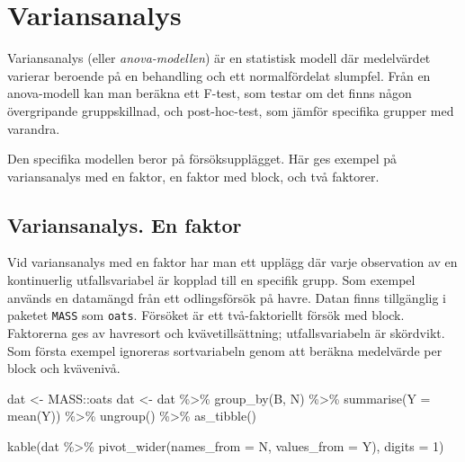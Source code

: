 \documentclass[
]{book}
\newenvironment{Shaded}{\begin{snugshade}}{\end{snugshade}}
\newcommand{\AttributeTok}[1]{\textcolor[rgb]{0.77,0.63,0.00}{#1}}
\newcommand{\DecValTok}[1]{\textcolor[rgb]{0.00,0.00,0.81}{#1}}
\newcommand{\FunctionTok}[1]{\textcolor[rgb]{0.00,0.00,0.00}{#1}}
\newcommand{\NormalTok}[1]{#1}
\newcommand{\OtherTok}[1]{\textcolor[rgb]{0.56,0.35,0.01}{#1}}
\newcommand{\SpecialCharTok}[1]{\textcolor[rgb]{0.00,0.00,0.00}{#1}}
\theoremstyle{definition}
\theoremstyle{definition}
\theoremstyle{definition}
\theoremstyle{definition}
\theoremstyle{remark}
\begin{document}
\hypertarget{variansanalys}{%
\chapter{Variansanalys}\label{variansanalys}}

Variansanalys (eller \emph{anova-modellen}) är en statistisk modell där medelvärdet varierar beroende på en behandling och ett normalfördelat slumpfel. Från en anova-modell kan man beräkna ett F-test, som testar om det finns någon övergripande gruppskillnad, och post-hoc-test, som jämför specifika grupper med varandra.

Den specifika modellen beror på försöksupplägget. Här ges exempel på variansanalys med en faktor, en faktor med block, och två faktorer.

\hypertarget{variansanalys.-en-faktor}{%
\section{Variansanalys. En faktor}\label{variansanalys.-en-faktor}}

Vid variansanalys med en faktor har man ett upplägg där varje observation av en kontinuerlig utfallsvariabel är kopplad till en specifik grupp. Som exempel används en datamängd från ett odlingsförsök på havre. Datan finns tillgänglig i paketet \texttt{MASS} som \texttt{oats}. Försöket är ett två-faktoriellt försök med block. Faktorerna ges av havresort och kvävetillsättning; utfallsvariabeln är skördvikt. Som första exempel ignoreras sortvariabeln genom att beräkna medelvärde per block och kvävenivå.

\begin{Shaded}
\begin{Highlighting}[]
\NormalTok{dat }\OtherTok{\textless{}{-}}\NormalTok{ MASS}\SpecialCharTok{::}\NormalTok{oats}
\NormalTok{dat }\OtherTok{\textless{}{-}}\NormalTok{ dat }\SpecialCharTok{\%\textgreater{}\%} 
  \FunctionTok{group\_by}\NormalTok{(B, N) }\SpecialCharTok{\%\textgreater{}\%} 
  \FunctionTok{summarise}\NormalTok{(}\AttributeTok{Y =} \FunctionTok{mean}\NormalTok{(Y)) }\SpecialCharTok{\%\textgreater{}\%} 
  \FunctionTok{ungroup}\NormalTok{() }\SpecialCharTok{\%\textgreater{}\%} 
  \FunctionTok{as\_tibble}\NormalTok{()}

\FunctionTok{kable}\NormalTok{(dat }\SpecialCharTok{\%\textgreater{}\%} \FunctionTok{pivot\_wider}\NormalTok{(}\AttributeTok{names\_from =}\NormalTok{ N, }\AttributeTok{values\_from =}\NormalTok{ Y), }
      \AttributeTok{digits =} \DecValTok{1}\NormalTok{)}
\end{Highlighting}
\end{Shaded}
\end{document}
